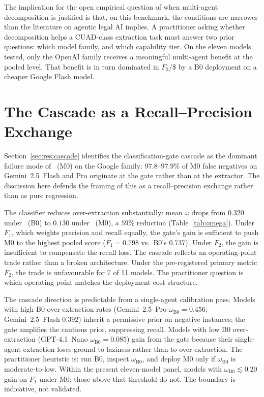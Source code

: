 The implication for the open empirical question of when multi-agent
decomposition is justified is that, on this benchmark, the conditions are
narrower than the literature on agentic legal AI implies. A practitioner
asking whether decomposition helps a CUAD-class extraction task must answer
two prior questions: which model family, and which capability tier. On the
eleven models tested, only the OpenAI family receives a meaningful
multi-agent benefit at the pooled level. That benefit is in turn dominated
in $F_2$/\$ by a B0 deployment on a cheaper Google Flash model.

\section{The Cascade as a Recall--Precision Exchange}\label{sec:disc:cascade}

Section~\ref{sec:res:cascade} identifies the classification-gate cascade as
the dominant failure mode of \cfgCX\ (M0) on the Google family:
$97.8$--$97.9\%$ of M0 false negatives on Gemini~2.5~Flash and Pro originate
at the gate rather than at the extractor. The discussion here defends the
framing of this as a recall--precision exchange rather than as pure regression.

The classifier reduces over-extraction substantially: mean $\omega$ drops
from $0.320$ under \cfgZS\ (B0) to $0.130$ under \cfgCX\ (M0), a $59\%$
reduction (Table~\ref{tab:omega}). Under $F_1$, which weights precision and
recall equally, the gate's gain is sufficient to push M0 to the highest pooled
score ($\overline{F_1}{=}0.798$ vs.\ B0's $0.737$). Under $F_2$, the gain
is insufficient to compensate the recall loss. The cascade reflects an
operating-point trade rather than a broken architecture. Under the pre-registered
primary metric $F_2$, the trade is unfavourable for 7 of 11 models. The
practitioner question is which operating point matches the deployment cost
structure.

The cascade direction is predictable from a single-agent calibration pass.
Models with high B0 over-extraction rates (Gemini~2.5~Pro
$\omega_{\text{B0}}{=}0.456$; Gemini~2.5~Flash $0.392$) inherit a permissive
prior on negative instances; the gate amplifies the cautious prior,
suppressing recall. Models with low B0 over-extraction (GPT-4.1~Nano
$\omega_{\text{B0}}{=}0.085$) gain from the gate because their single-agent
extraction loses ground to laziness rather than to over-extraction. The
practitioner heuristic is: run B0, inspect $\omega_{\text{B0}}$, and deploy
M0 only if $\omega_{\text{B0}}$ is moderate-to-low. Within the present
eleven-model panel, models with $\omega_{\text{B0}} \lesssim 0.20$ gain on
$F_1$ under M0; those above that threshold do not. The boundary is indicative,
not validated.

